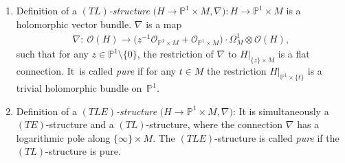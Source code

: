 \documentclass[10pt,a4paper]{amsart}
\numberwithin{equation}{section}
\numberwithin{figure}{section}
\renewcommand{\P}{{\mathbb P}}
\newcommand{\OO}{{\mathcal O}}
\begin{document}
\begin{Definition}
\begin{enumerate}
\item[$(c)$] Definition of a {\it $(TL)$-structure} $\big(H\to\P^1\times M,\nabla\big)\colon
H\to\P^1\times M$ is a holomorphic vector bundle.
$\nabla$ is a map\vspace{-.5ex}
\begin{gather*}%
\nabla\colon\ \OO(H)\to \big(z^{-1}\OO_{\P^1\times M}+\OO_{\P^1\times M}\big)
\cdot \Omega^1_M\otimes \OO(H),
\end{gather*}
such that for any $z\in\P^1\setminus\{0\}$, the restriction
of $\nabla$ to $H|_{\{z\}\times M}$ is a flat connection. It~is called {\it pure} if for any $t\in M$ the restriction
$H|_{\P^1\times\{t\}}$ is a trivial holomorphic bundle on~$\P^1$.

\item[$(d)$] Definition of a {\it $(TLE)$-structure}
$\big(H\to\P^1\times M,\nabla\big)$:
It is simultaneously a $(TE)$-structure and a
$(TL)$-structure, where the connection $\nabla$
has a logarithmic pole along $\{\infty\}\times M$.
The $(TLE)$-structure is called {\it pure} if the
$(TL)$-structure is pure.
\end{enumerate}
\end{Definition}
\end{document}
